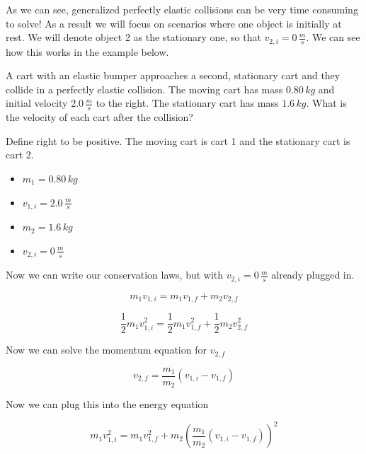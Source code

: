 \documentclass[12pt]{book}
\begin{document}
As we can see, generalized perfectly elastic collisions can be very time consuming to solve! As a result we will focus on scenarios where one object is initially at rest. We will denote object 2 as the stationary one, so that $v_{2,i} = 0 \, \frac{m}{s}$. We can see how this works in the example below.

\begin{exampleblock}

A cart with an elastic bumper approaches a second, stationary cart and they collide in a perfectly elastic collision. The moving cart has mass $0.80 \, kg$ and initial velocity $2.0 \, \frac{m}{s}$ to the right. The stationary cart has mass $1.6 \, kg$. What is the velocity of each cart after the collision?

\hspace{10pt}

Define right to be positive. The moving cart is cart 1 and the stationary cart is cart 2.

\begin{itemize}
\item $m_1 = 0.80 \, kg$
\item $v_{1,i} = 2.0 \, \frac{m}{s}$
\item $m_2 = 1.6 \, kg$
\item $v_{2,i} = 0 \, \frac{m}{s}$
\end{itemize}

Now we can write our conservation laws, but with $v_{2,i} = 0 \, \frac{m}{s}$ already plugged in.

\begin{equation}
m_1 v_{1,i} = m_1 v_{1,f} + m_2 v_{2,f}
\end{equation}

\begin{equation}
\frac{1}{2} m_1 v_{1,i}^2 = \frac{1}{2} m_1 v_{1,f}^2 + \frac{1}{2} m_2 v_{2,f}^2
\end{equation}

Now we can solve the momentum equation for $v_{2,f}$

\begin{equation}
v_{2,f} = \frac{m_1}{m_2}(v_{1,i} - v_{1,f})
\end{equation}

Now we can plug this into the energy equation

\begin{equation}
m_1 v_{1,i}^2 = m_1 v_{1,f}^2 + m_2 \left( \frac{m_1}{m_2} (v_{1,i} - v_{1,f}) \right)^2
\end{equation}


\end{exampleblock}
\end{document}
